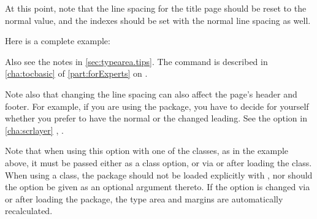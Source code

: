 At this point, note that the line spacing for the title
page should be reset to the normal value, and the indexes should be set with
the normal line spacing as well.
\begin{Example}
  Here is a complete example:
  Also see the notes in \autoref{sec:typearea.tips}. The 
   command is
  described in \autoref{cha:tocbasic} of \autoref{part:forExperts} on
  .
\end{Example}
Note also that changing the line spacing can also affect the page's header and
footer. For example, if you are using the  package,
you have to decide for yourself whether you prefer to have the normal or the
changed leading. See the  option in
\autoref{cha:scrlayer}%
,
.

Note that when using this option with one of the
{\KOMAScript} classes, as in the example above, it must be passed either as a
class option, or via  or
 after loading the class. When using a
{\KOMAScript} class, the  package should not be loaded
explicitly with , nor should the option be
given as an optional argument thereto. If the option is changed via
 or 
after loading the package, the type area and margins are automatically
recalculated.%
%
\EndIndexGroup


